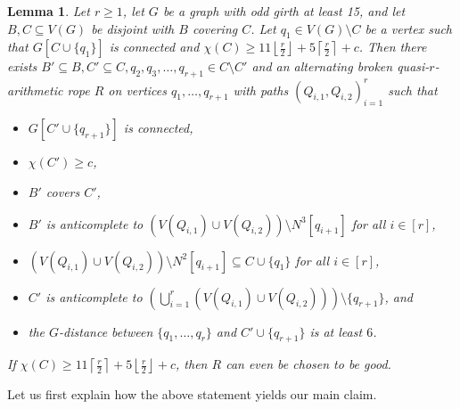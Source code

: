 \documentclass{article}
\newtheorem{lemma}[theorem]{Lemma}
\begin{document}
\begin{lemma}\label{lemma:construction_almost_broken}
    Let $r \geq 1$, let $G$ be a graph with odd girth at least 15, and let $B, C \subseteq V(G)$ be disjoint with $B$ covering $C$. Let $q_1 \in V(G) \setminus C$ be a vertex such that $G[C \cup \{q_1\}]$ is connected and $\chi(C) \geq 11 \left\lfloor \frac{r}{2} \right\rfloor + 5 \left\lceil \frac{r}{2} \right\rceil + c$. Then there exists $B' \subseteq B, C' \subseteq C, q_2, q_3, \dots, q_{r + 1} \in C \setminus C'$ and an alternating broken quasi-$r$-arithmetic rope $R$ on vertices $q_1,\dots,q_{r+1}$ with paths $(Q_{i, 1}, Q_{i, 2})_{i = 1}^r$ such that 
    \begin{itemize}
        \item $G[C' \cup \{q_{r + 1}\}]$ is connected,
        \item $\chi(C') \geq c$,
        \item $B'$ covers $C'$,
        \item $B'$ is anticomplete to $(V(Q_{i, 1}) \cup V(Q_{i, 2})) \setminus N^3[q_{i + 1}]$ for   all $i \in [r]$,
        \item $(V(Q_{i, 1}) \cup V(Q_{i, 2})) \setminus N^2[q_{i + 1}] \subseteq C \cup \{q_1\}$ for all $i \in [r]$,
        \item $C'$ is anticomplete to $\left( \bigcup_{i = 1}^r (V(Q_{i, 1}) \cup V(Q_{i, 2})) \right) \setminus \{q_{r + 1}\}$, and
        \item the $G$-distance between $\{q_1, \dots, q_{r}\}$ and $C' \cup \{q_{r+  1}\}$ is at least $6$. 
    \end{itemize}
    If $\chi(C) \geq 11 \left\lceil \frac{r}{2} \right\rceil + 5 \left\lfloor \frac{r}{2} \right\rfloor + c$, then $R$ can even be chosen to be good.
\end{lemma}

Let us first explain how the above statement yields our main claim.
\end{document}
